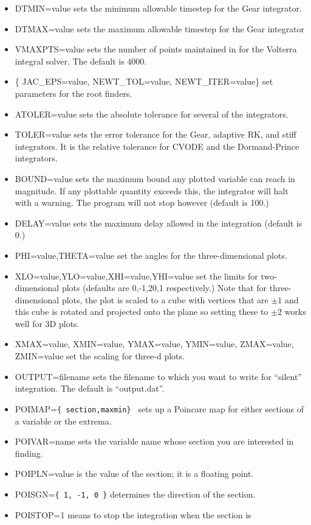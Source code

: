 \documentclass{article}
\begin{document}
\begin{itemize}
and the symplectic integrators.  
\item DTMIN=value sets the minimum allowable timestep for the Gear
integrator.
\item DTMAX=value sets the maximum allowable timestep for the Gear
integrator
\item VMAXPTS=value sets the number of points maintained in for the
Volterra integral solver. The default is 4000.
\item \{ JAC\_EPS=value, NEWT\_TOL=value, NEWT\_ITER=value\} set
parameters for the root finders.
\item ATOLER=value sets the absolute tolerance for several of the 
integrators.
\item TOLER=value sets the error tolerance for the Gear, adaptive RK,
and stiff integrators. It is the relative tolerance for CVODE and the
Dormand-Prince integrators. 
\item BOUND=value sets the maximum bound any plotted variable can
reach in magnitude. If any plottable quantity exceeds this, the
integrator will halt with a warning.  The program will not stop
however (default is 100.)
\item DELAY=value sets the maximum delay allowed in the integration
(default is 0.)
\item PHI=value,THETA=value set the angles for the three-dimensional
plots.
\item XLO=value,YLO=value,XHI=value,YHI=value set the limits for
two-dimensional plots (defaults are 0,-1,20,1 respectively.) Note that
for three-dimensional plots, the plot is scaled to a cube with
vertices that are $\pm1$ and this cube is rotated and projected onto
the plane so setting these to $\pm2$ works well for 3D plots.
\item
XMAX=value, XMIN=value, YMAX=value, YMIN=value, ZMAX=value, ZMIN=value set
the scaling for three-d plots.
\item OUTPUT=filename sets the filename to which you want to write for
``silent'' integration.  The default is ``output.dat''. 
\item POIMAP={\tt \{ section,maxmin\} } sets up a Poincare map for
either sections of a variable or the extrema.  
\item POIVAR=name sets the variable name whose section you are
interested in finding.
\item POIPLN=value is the value of the section; it is a floating
point.
\item POISGN={\tt \{ 1, -1, 0 \}} determines the direction of the
section.  
\item POISTOP=1 means to stop the integration when the section is

\end{itemize}
\end{document}
